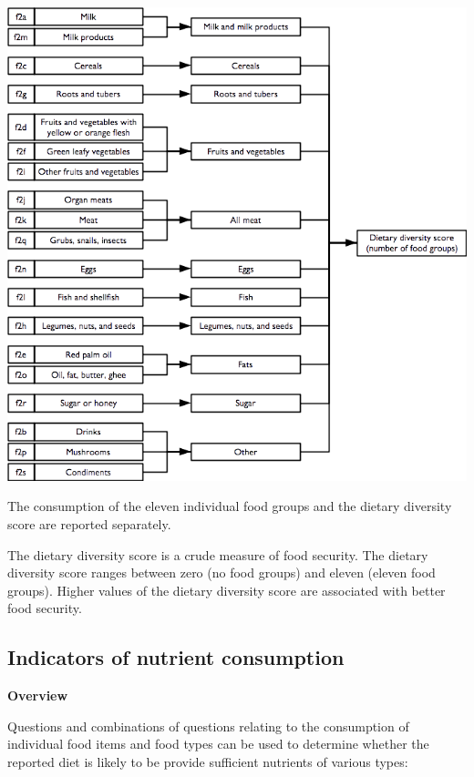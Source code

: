 \documentclass[12pt,a4paper]{book}
\theoremstyle{definition}
\theoremstyle{definition}
\theoremstyle{definition}
\theoremstyle{remark}
\begin{document}
\begin{center}\includegraphics[width=9.76in]{figures/indicators06} \end{center}

The consumption of the eleven individual food groups and the dietary
diversity score are reported separately.

The dietary diversity score is a crude measure of food security. The
dietary diversity score ranges between zero (no food groups) and eleven
(eleven food groups). Higher values of the dietary diversity score are
associated with better food security.

\hypertarget{indicators-of-nutrient-consumption}{%
\subsection{Indicators of nutrient
consumption}\label{indicators-of-nutrient-consumption}}

\textbf{Overview}

Questions and combinations of questions relating to the consumption of
individual food items and food types can be used to determine whether
the reported diet is likely to be provide sufficient nutrients of
various types:
\end{document}
